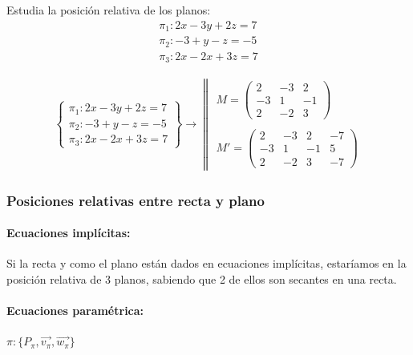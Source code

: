 \begin{problem}
Estudia la posición relativa de los planos: 
\begin{align*}
\pi_1: 2x-3y+2z=7\\
\pi_2: -3+y-z=-5\\
\pi_3:2x-2x+3z=7
\end{align*}
\solution

\begin{align*}
\left\{
\begin{array}{c}
    \pi_1: 2x-3y+2z=7\\
    \pi_2: -3+y-z=-5\\
    \pi_3:2x-2x+3z=7
\end{array}
\right\} \to
\left\|
\begin{array}{c}
M = \begin{pmatrix}             2&-3&2\\-3&1&-1\\2&-2&3
\end{pmatrix} \\\\
M' = \begin{pmatrix}             2&-3&2&-7\\-3&1&-1&5\\2&-2&3&-7
\end{pmatrix} \end{array}\right.
\end{align*}


\end{problem}


\subsubsection{Posiciones relativas entre recta y plano}

\paragraph{Ecuaciones implícitas: } Si la recta y como el plano están dados en ecuaciones implícitas, estaríamos en la posición relativa de 3 planos, sabiendo que 2 de ellos son secantes en una recta.

\paragraph{Ecuaciones paramétrica: } $\pi: \{P_{\pi},\vec{v_{\pi}}, \vec{w_{\pi}}\}$ 

